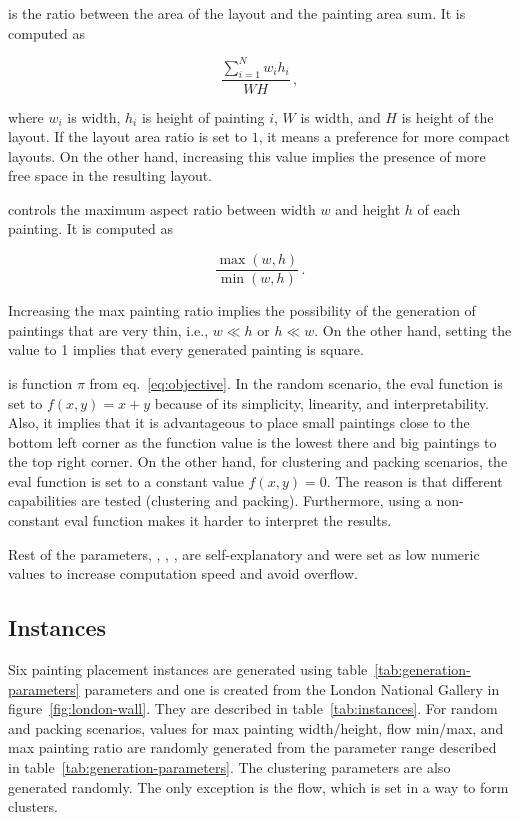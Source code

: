  is the ratio between the area of the layout and the painting area sum.
It is computed as

\[
    \dfrac{\sum\limits_{i=1}^{N} w_i h_i}{WH}\,,
\]

where $w_i$ is width, $h_i$ is height of painting $i$, $W$ is width, and $H$ is height of the layout.
If the layout area ratio is set to $1$, it means a preference for more compact layouts.
On the other hand,
increasing this value implies the presence of more free space in the resulting layout.

 controls the maximum aspect ratio between width $w$ and height $h$ of each painting.
It is computed as

\[
    \dfrac{\max(w,h)}{\min(w,h)}\,.
\]

Increasing the max painting ratio implies the possibility of the generation of paintings
that are very thin, i.e., $w \ll h$ or $h \ll w$.
On the other hand, setting the value to 1
implies that every generated painting is square.

 is function $\pi$ from eq.~\ref{eq:objective}.
In the random scenario, the eval function is set to $f(x,y) = x+y$ because of its simplicity, linearity, and interpretability.
Also, it implies that it is advantageous to place small paintings close to the bottom left corner as the function value is the lowest there and
big paintings to the top right corner.
On the other hand, for clustering and packing scenarios, the eval function is set to a constant value $f(x,y) = 0$.
The reason is that different capabilities are tested (clustering and packing).
Furthermore, using a non-constant eval function makes it harder to interpret the results.

Rest of the parameters, , , , 
are self-explanatory and were set as low numeric values to increase computation speed and avoid overflow.

\subsection{Instances}\label{subsec:instances}

Six painting placement instances are generated using table~\ref{tab:generation-parameters} parameters
and one is created from the London National Gallery in figure~\ref{fig:london-wall}.
They are described in table~\ref{tab:instances}.
For random and packing scenarios, values for max painting width/height, flow min/max, and max painting ratio are randomly generated from the parameter range described in table~\ref{tab:generation-parameters}.
The clustering parameters are also generated randomly.
The only exception is the flow, which is set in a way to form clusters.

